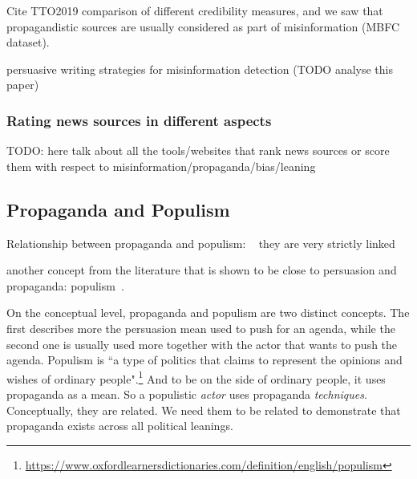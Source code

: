 Cite TTO2019 comparison of different credibility measures, and we saw that propagandistic sources are usually considered as part of misinformation (MBFC dataset).


\cite{romain2022misinformation} persuasive writing strategies for misinformation detection (TODO analyse this paper)

\subsubsection{Rating news sources in different aspects}

TODO: here talk about all the tools/websites that rank news sources or score them with respect to misinformation/propaganda/bias/leaning

\subsection{Propaganda and Populism}

Relationship between propaganda and populism:
~\cite{tumber2021routledge,pasquino2008populism}
they are very strictly linked

another concept from the literature that is shown to be close to persuasion and propaganda: \gls{populism}~\citep{tumber2021routledge,pasquino2008populism}.

On the conceptual level, propaganda and populism are two distinct concepts. The first describes more the persuasion mean used to push for an agenda, while the second one is usually used more together with the actor that wants to push the agenda. Populism is ``a type of politics that claims to represent the opinions and wishes of ordinary people".\footnote{\url{https://www.oxfordlearnersdictionaries.com/definition/english/populism}}
And to be on the side of ordinary people, it uses propaganda as a mean. So a populistic \emph{actor} uses propaganda \emph{techniques}. Conceptually, they are related.
We need them to be related to demonstrate that propaganda exists across all political leanings.


